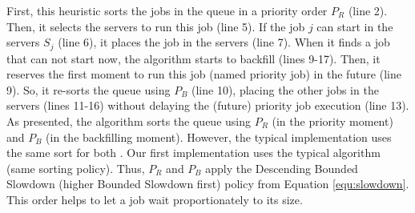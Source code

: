 First, this heuristic sorts the jobs in the queue in a priority order $P_{R}$ (line 2). Then, it selects the servers to run this job (line 5). If the job $j$ can start in the servers $S_j$ (line 6), it places the job in the servers (line 7). When it finds a job that can not start now, the algorithm starts to backfill (lines 9-17). Then, it reserves the first moment to run this job (named priority job) in the future (line 9). So, it re-sorts the queue using $P_{B}$ (line 10), placing the other jobs in the servers (lines 11-16) without delaying the (future) priority job execution (line 13). As presented, the algorithm sorts the queue using $P_{R}$ (in the priority moment) and $P_{B}$ (in the backfilling moment). However, the typical implementation uses the same sort for both \cite{lelong2018tuning}. Our first implementation uses the typical algorithm (same sorting policy). Thus, $P_{R}$ and $P_{B}$ apply the Descending Bounded Slowdown (higher Bounded Slowdown first) policy from Equation \ref{equ:slowdown}. This order helps to let a job wait proportionately to its size.

